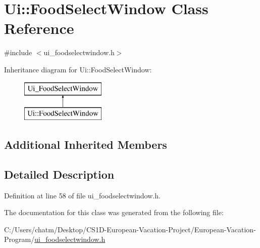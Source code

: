 \hypertarget{class_ui_1_1_food_select_window}{}\section{Ui\+::Food\+Select\+Window Class Reference}
\label{class_ui_1_1_food_select_window}


{\ttfamily \#include $<$ui\+\_\+foodselectwindow.\+h$>$}

Inheritance diagram for Ui\+::Food\+Select\+Window\+:\begin{figure}[H]
\begin{center}
\leavevmode
\includegraphics[height=2.000000cm]{class_ui_1_1_food_select_window}
\end{center}
\end{figure}
\subsection*{Additional Inherited Members}


\subsection{Detailed Description}


Definition at line 58 of file ui\+\_\+foodselectwindow.\+h.



The documentation for this class was generated from the following file\+:\begin{DoxyCompactItemize}
\item 
C\+:/\+Users/chatm/\+Desktop/\+C\+S1\+D-\/\+European-\/\+Vacation-\/\+Project/\+European-\/\+Vacation-\/\+Program/\mbox{\hyperlink{ui__foodselectwindow_8h}{ui\+\_\+foodselectwindow.\+h}}\end{DoxyCompactItemize}
